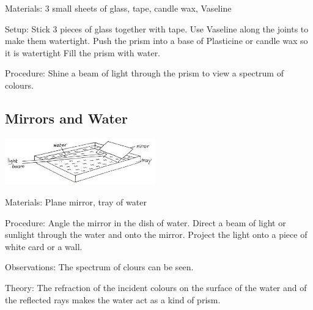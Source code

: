 \begin{multicols}{2}
\begin{description*}
\item[Materials:]{3 small sheets of glass, tape, candle wax, Vaseline}
\item[Setup:]{Stick 3 pieces of glass together with tape. Use Vaseline along the joints to make them watertight. Push the prism into a base of Plasticine or candle wax so it is watertight Fill the prism with water.}
\item[Procedure:]{Shine a beam of light through the prism to view a spectrum of colours.}
\end{description*}

\columnbreak

\subsection{Mirrors and Water}

\begin{center}
\includegraphics[width=0.49\textwidth]{./img/vso/dispersion-mirror.jpg}
\end{center}

\begin{description*}
\item[Materials:]{Plane mirror, tray of water}
\item[Procedure:]{Angle the mirror in the dish of water. Direct a beam of light or sunlight through the water and onto the mirror. Project the light onto a piece of white card or a wall.}
\item[Observations:]{The spectrum of clours can be seen.}
\item[Theory:]{The refraction of the incident colours on the surface of the water and of the reflected rays makes the water act as a kind of prism.}
\end{description*}


\end{multicols}
